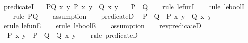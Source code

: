 \begin{isabellebody}
\endisatagproof
{\isafoldproof}%
%
\isadelimproof
\isanewline
%
\endisadelimproof
\isanewline
{}\isamarkupfalse%
\ predicate{}I{\isacharcolon}{\kern0pt}\isanewline
\ \ \ PQ{\isacharcolon}{\kern0pt}\ {\isachardoublequoteopen}{\isasymAnd}x\ y{\isachardot}{\kern0pt}\ P\ x\ y\ {\isasymLongrightarrow}\ Q\ x\ y{\isachardoublequoteclose}\isanewline
\ \ \ {\isachardoublequoteopen}P\ {\isasymle}\ Q{\isachardoublequoteclose}\isanewline
%
\isadelimproof
\ \ %
\endisadelimproof
%
\isatagproof
{}\isamarkupfalse%
\ {\isacharparenleft}{\kern0pt}rule\ le{\isacharunderscore}{\kern0pt}funI{\isacharparenright}{\kern0pt}{\isacharplus}{\kern0pt}\isanewline
\ \ \isamarkupfalse%
\ {\isacharparenleft}{\kern0pt}rule\ le{\isacharunderscore}{\kern0pt}boolI{\isacharparenright}{\kern0pt}\isanewline
\ \ \isamarkupfalse%
\ {\isacharparenleft}{\kern0pt}rule\ PQ{\isacharparenright}{\kern0pt}\isanewline
\ \ \isamarkupfalse%
\ assumption\isanewline
\ \ \isamarkupfalse%
%
\endisatagproof
{\isafoldproof}%
%
\isadelimproof
\isanewline
%
\endisadelimproof
\isanewline
{}\isamarkupfalse%
\ predicate{}D{\isacharcolon}{\kern0pt}\isanewline
\ \ {\isachardoublequoteopen}P\ {\isasymle}\ Q\ {\isasymLongrightarrow}\ P\ x\ y\ {\isasymLongrightarrow}\ Q\ x\ y{\isachardoublequoteclose}\isanewline
%
\isadelimproof
\ \ %
\endisadelimproof
%
\isatagproof
{}\isamarkupfalse%
\ {\isacharparenleft}{\kern0pt}erule\ le{\isacharunderscore}{\kern0pt}funE{\isacharparenright}{\kern0pt}{\isacharplus}{\kern0pt}\isanewline
\ \ \isamarkupfalse%
\ {\isacharparenleft}{\kern0pt}erule\ le{\isacharunderscore}{\kern0pt}boolE{\isacharparenright}{\kern0pt}\isanewline
\ \ \isamarkupfalse%
\ assumption{\isacharplus}{\kern0pt}\isanewline
\ \ \isamarkupfalse%
%
\endisatagproof
{\isafoldproof}%
%
\isadelimproof
\isanewline
%
\endisadelimproof
\isanewline
{}\isamarkupfalse%
\ rev{\isacharunderscore}{\kern0pt}predicate{}D{\isacharcolon}{\kern0pt}\isanewline
\ \ {\isachardoublequoteopen}P\ x\ y\ {\isasymLongrightarrow}\ P\ {\isasymle}\ Q\ {\isasymLongrightarrow}\ Q\ x\ y{\isachardoublequoteclose}\isanewline
%
\isadelimproof
\ \ %
\endisadelimproof
%
\isatagproof
{}\isamarkupfalse%
\ {\isacharparenleft}{\kern0pt}rule\ predicate{}D{\isacharparenright}{\kern0pt}%
\endisatagproof
{\isafoldproof}%
%
\isadelimproof
\isanewline
%
\endisadelimproof

\end{isabellebody}
